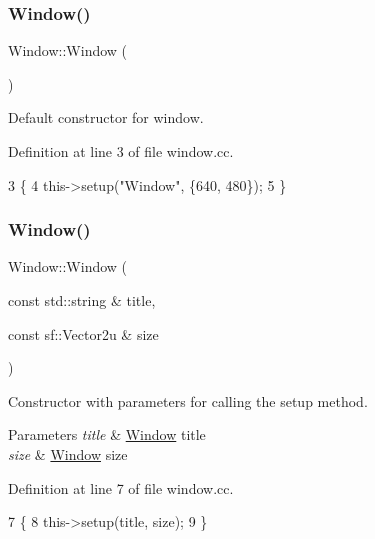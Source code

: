 \subsubsection{\texorpdfstring{Window()}{Window()}\hspace{0.1cm}{\footnotesize\ttfamily [1/2]}}
{\footnotesize\ttfamily Window\+::\+Window (\begin{DoxyParamCaption}{ }\end{DoxyParamCaption})}



Default constructor for window. 



Definition at line 3 of file window.\+cc.


\begin{DoxyCode}
3                \{
4     this->setup(\textcolor{stringliteral}{"Window"}, \{640, 480\});
5 \}
\end{DoxyCode}
\mbox{\label{class_window_a11aa538fb51a75a2017d6a1b3c7ccd34}} 
\subsubsection{\texorpdfstring{Window()}{Window()}\hspace{0.1cm}{\footnotesize\ttfamily [2/2]}}
{\footnotesize\ttfamily Window\+::\+Window (\begin{DoxyParamCaption}\item[{const std\+::string \&}]{title,  }\item[{const sf\+::\+Vector2u \&}]{size }\end{DoxyParamCaption})}



Constructor with parameters for calling the setup method. 


\begin{DoxyParams}{Parameters}
{\em title} & \hyperlink{class_window}{Window} title \\
\hline
{\em size} & \hyperlink{class_window}{Window} size \\
\hline
\end{DoxyParams}


Definition at line 7 of file window.\+cc.


\begin{DoxyCode}
7                                                              \{
8     this->setup(title, size);
9 \}
\end{DoxyCode}
\mbox{\label{class_window_a245d821e6016fa1f6970ccbbedd635f6}} 
